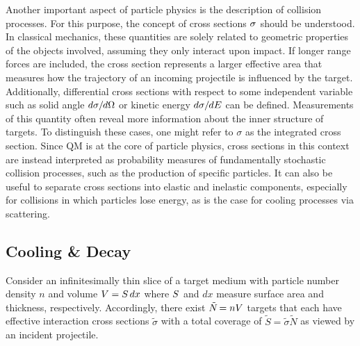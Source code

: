 \begin{spacing}{0.985}
	Another important aspect of particle physics is the description of collision processes. For this purpose, the concept of cross
	sections $\sigma \kern+0.5pt$ should be understood. In classical mechanics, these quantities are solely related to geometric
	properties of the objects involved, assuming they only interact upon impact. If longer range forces are included, the
	cross section represents a larger effective area that measures how the trajectory of an incoming projectile is influenced by
	the target. Additionally, differential cross sections with respect to some independent variable such as solid angle
	$d\sigma \kern-0.3pt / \kern-0.6pt d\Omega$ or kinetic energy $d\sigma \kern-0.3pt / \kern-0.6pt dE$ can be defined.
	Measurements of this quantity often reveal more information about the inner structure of targets. To distinguish these cases,
	one might refer to $\sigma$ as the integrated cross section. Since QM is at the core of particle physics, cross sections in this
	context are instead interpreted as probability measures of fundamentally stochastic collision processes, such as the production
	of specific particles. It can also be useful to separate cross sections into elastic and inelastic components, especially for
	collisions in which particles lose energy, as is the case for cooling processes via scattering.



	\subsection{Cooling \& Decay}
	\label{sub:cooling}

	Consider an infinitesimally thin slice of a target medium with particle number density $n$ and volume $V \kern-0.1pt = S \kern+1.5pt dx$
	where $S \kern+0.5pt$ and $dx$ measure surface area and thickness, respectively. Accordingly, there exist $\tilde{N} \kern-1.2pt = nV$
	targets that each have effective interaction cross sections $\tilde{\sigma}$ with a total coverage of $\tilde{S} = \tilde{\sigma} \tilde{N}$
	as viewed by an incident projectile.
\end{spacing}

